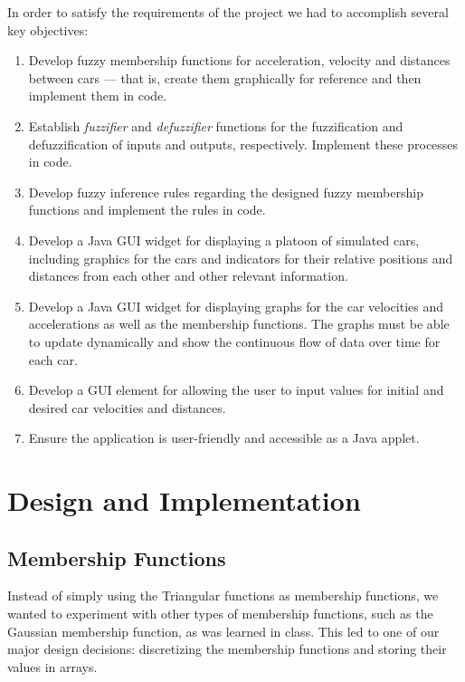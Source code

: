 \documentclass[12pt,letterpaper,oneside]{report}
\begin{document}
In order to satisfy the requirements of the project we had to accomplish
several key objectives:
\begin{enumerate}

\item Develop fuzzy membership functions for acceleration, velocity and
distances between cars --- that is, create them graphically for reference and
then implement them in code.

\item Establish \textit{fuzzifier} and \textit{defuzzifier} functions
for the fuzzification and defuzzification of inputs and outputs,
respectively. Implement these processes in code.

\item Develop fuzzy inference rules regarding the designed fuzzy
membership functions and implement the rules in code.

\item Develop a Java GUI widget for displaying a platoon of simulated cars,
including graphics for the cars and indicators for their relative positions
and distances from each other and other relevant information.

\item Develop a Java GUI widget for displaying graphs for the car velocities
and accelerations as well as the membership functions. The graphs must be
able to update dynamically and show the continuous flow of data over time
for each car.

\item Develop a GUI element for allowing the user to input values for
initial and desired car velocities and distances.

\item Ensure the application is user-friendly and accessible as a Java applet.

\end{enumerate}

\clearpage
\section{Design and Implementation}
\subsection{Membership Functions}
Instead of simply using the Triangular functions as membership functions, we
wanted to experiment with other types of membership functions, such as the
Gaussian membership function, as was learned in class. This led to one
of our major design decisions: discretizing the membership functions and
storing their values in arrays. 
\end{document}
